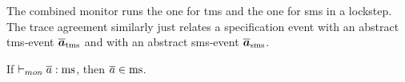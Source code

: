 \documentclass[utf8,acmsmall,review,screen,dvipsnames,anonymous]{acmart}
\begin{document}
\begin{center}
  $\;$\\
\end{center}
The combined monitor runs the one for \gls*{tms} and the one for \gls*{sms} in a lockstep. The trace agreement similarly just relates a specification event with an abstract \gls*{tms}-event $\abstrace[_{\tmssafe}]$ and with an abstract \gls*{sms}-event $\abstrace[_{\smssafe}]$.

\begin{lemma}\label{lem:mon:msafe}
  If $\monmssafe{\trace}$, then $\trace\in\mssafe$.\Coqed
\end{lemma}
\end{document}
